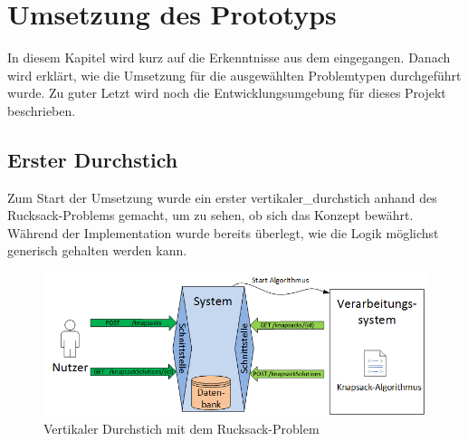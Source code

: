 %
%

\chapter{Umsetzung des Prototyps \resultAssignment{[R5]}}\label{chap.umsetzung}
In diesem Kapitel wird kurz auf die Erkenntnisse aus dem  eingegangen. Danach wird erklärt, wie die Umsetzung für die ausgewählten 
Problemtypen durchgeführt wurde. Zu guter Letzt wird noch die Entwicklungsumgebung für dieses Projekt beschrieben.

\section{Erster Durchstich}\label{entwicklungsumgebung}
Zum Start der Umsetzung wurde ein erster \gls{vertikaler_durchstich} anhand des Rucksack-Problems gemacht, um zu sehen, ob sich das Konzept bewährt. Während der 
Implementation wurde bereits überlegt, wie die Logik möglichst generisch gehalten werden kann.

\begin{figure}[h]
\centering
\includegraphics[scale=0.74]{images/visio/prototype_knapsack.png}
\caption[\Gls{vertikaler_durchstich} mit dem Rucksack-Problem]{Vertikaler Durchstich mit dem Rucksack-Problem \selfmade{}}
\label{fig:prototyp_knapsack}
\end{figure}

